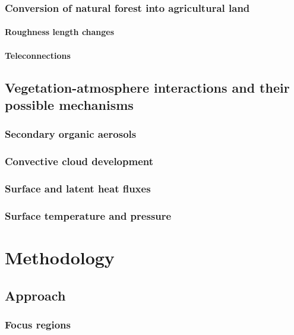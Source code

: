 \documentclass[12pt,a4paper,twoside]{book}
\begin{document}
\subsection{Conversion of natural forest into agricultural land}

\subsubsection{Roughness length changes}

\subsubsection{Teleconnections}

\section{Vegetation-atmosphere interactions and their possible mechanisms}

\subsection{Secondary organic aerosols}

\subsection{Convective cloud development}

\subsection{Surface and latent heat fluxes}

\subsection{Surface temperature and pressure}

	\chapter{Methodology}

\section{Approach}

\subsection{Focus regions}
\end{document}
